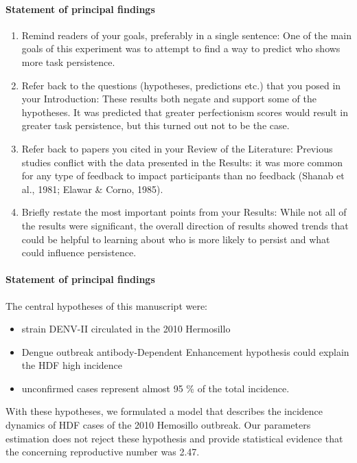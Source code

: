 	\paragraph{Statement of principal findings}
	\begin{enumerate}
		\item
			Remind readers of your goals, preferably in a single sentence:
			One of the main goals of this experiment was to attempt
			 to find a way to predict who shows more task persistence.
		\item
			Refer back to the questions (hypotheses, predictions etc.) 
			that you posed in your Introduction:
			These results both negate and support some of the hypotheses.
			It was predicted that greater perfectionism scores would result
			in greater task persistence, but this turned out not to be
			the case.
		\item
			Refer back to papers you cited in your Review of the Literature:
			Previous studies conflict with the data presented in the Results: 
			it was more common for any type of feedback to impact participants 
			than no feedback (Shanab et al., 1981; Elawar \&  Corno, 1985).
		\item
			Briefly restate the most important points from your Results:
			While not all of the results were significant, 
			the overall direction of results showed trends 
			that could be helpful to learning about who is more 
			likely to persist and what could influence persistence.
	\end{enumerate}
    \paragraph{Statement of principal findings}
        The central hypotheses of this manuscript were:
        \begin{itemize}
            \item
                strain DENV-II circulated in the 2010 Hermosillo 
            \item
                Dengue outbreak antibody-Dependent Enhancement hypothesis
                could explain the HDF high incidence 
            \item
                unconfirmed cases represent almost 95 \% of the total
                incidence.
        \end{itemize}
    With these hypotheses, we formulated a model that describes
    the incidence dynamics of HDF cases of the 2010 Hemosillo outbreak.
    Our parameters estimation does not reject these hypothesis and provide
    statistical evidence that the concerning reproductive number was 2.47.
    



